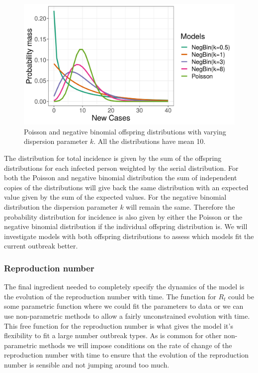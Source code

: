 \documentclass[12pt]{article}
\begin{document}
\begin{figure}[h]
  \centering
  \includegraphics[width=\textwidth]{../output/prob_dist.png}
  \caption{Poisson and negative binomial offspring distributions with varying dispersion parameter $k$. All the distributions have mean 10.}
  \label{fig:offspring}
\end{figure}

The distribution for total incidence is given by the sum of the offspring distributions for each infected person weighted by the serial distribution. For both the Poisson and negative binomial distribution the sum of independent copies of the distributions will give back the same distribution with an expected value given by the sum of the expected values. For the negative binomial distribution the dispersion parameter $k$ will remain the same. Therefore the probability distribution for incidence is also given by either the Poisson or the negative binomial distribution if the individual offspring distribution is. We will investigate models with both offspring distributions to assess which models fit the current outbreak better.

\subsubsection{Reproduction number}
The final ingredient needed to completely specify the dynamics of the model is the evolution of the reproduction number with time. The function for $R_t$ could be some parametric function where we could fit the parameters to data or we can use non-parametric methods to allow a fairly unconstrained evolution with time. This free function for the reproduction number is what gives the model it's flexibility to fit a large number outbreak types. As is common for other non-parametric methods we will impose conditions on the rate of change of the reproduction number with time to ensure that the evolution of the reproduction number is sensible and not jumping around too much.
\end{document}
